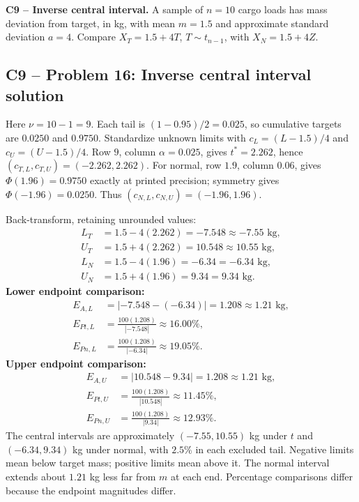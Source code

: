 {
\textbf{C9 -- Inverse central interval.} A sample of $n=10$ cargo loads has mass deviation from target, in kg, with mean $m=1.5$ and approximate standard deviation $a=4$. Compare $X_T=1.5+4T$, $T\sim t_{n-1}$, with $X_N=1.5+4Z$.
\label{sol:q16}
\subsection*{C9 -- Problem 16: Inverse central interval solution }
Here $\nu=10-1=9$. Each tail is $(1-0.95)/2=0.025$, so cumulative targets are $0.0250$ and $0.9750$.
Standardize unknown limits with $c_L=(L-1.5)/4$ and $c_U=(U-1.5)/4$.
Row $9$, column $\alpha=0.025$, gives $t^*=2.262$, hence $(c_{T,L},c_{T,U})=(-2.262,2.262)$.
For normal, row $1.9$, column $0.06$, gives $\Phi(1.96)=0.9750$ exactly at printed precision; symmetry gives $\Phi(-1.96)=0.0250$.
Thus $(c_{N,L},c_{N,U})=(-1.96,1.96)$.

Back-transform, retaining unrounded values:
\[
 \begin{aligned}
 L_T&=1.5-4(2.262)=-7.548\approx\boxed{-7.55\text{ kg}},\\
 U_T&=1.5+4(2.262)=10.548\approx\boxed{10.55\text{ kg}},\\
 L_N&=1.5-4(1.96)=-6.34=\boxed{-6.34\text{ kg}},\\
 U_N&=1.5+4(1.96)=9.34=\boxed{9.34\text{ kg}}.
 \end{aligned}
\]
\textbf{Lower endpoint comparison:}
\[
 \begin{aligned}
 E_{A,L}&=|-7.548-(-6.34)|=1.208\approx\boxed{1.21\text{ kg}},\\
 E_{Pt,L}&=\frac{100(1.208)}{|-7.548|}\approx\boxed{16.00\%},\\
 E_{Pn,L}&=\frac{100(1.208)}{|-6.34|}\approx\boxed{19.05\%}.
 \end{aligned}
\]
\textbf{Upper endpoint comparison:}
\[
 \begin{aligned}
 E_{A,U}&=|10.548-9.34|=1.208\approx\boxed{1.21\text{ kg}},\\
 E_{Pt,U}&=\frac{100(1.208)}{|10.548|}\approx\boxed{11.45\%},\\
 E_{Pn,U}&=\frac{100(1.208)}{|9.34|}\approx\boxed{12.93\%}.
 \end{aligned}
\]
The central intervals are approximately $(-7.55,10.55)$ kg under $t$ and $(-6.34,9.34)$ kg under normal, with $2.5\%$ in each excluded tail.
Negative limits mean below target mass; positive limits mean above it.
The normal interval extends about $1.21$ kg less far from $m$ at each end.
Percentage comparisons differ because the endpoint magnitudes differ.
\secInicio[sec:q16]
}

